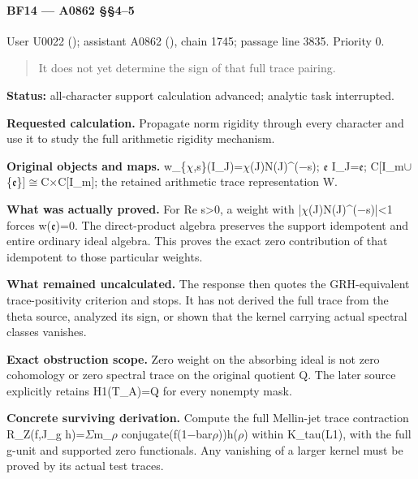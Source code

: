 \paragraph{BF14 --- A0862 §§4--5}\label{bf14-a0862-45}

User U0022 (\protect{});
assistant A0862 (\protect{}),
chain 1745; passage line 3835. Priority 0.

\begin{quote}
It does not yet determine the sign of that full trace pairing.
\end{quote}

\textbf{Status:} all-character support calculation advanced; analytic
task interrupted.

\textbf{Requested calculation.} Propagate norm rigidity through every
character and use it to study the full arithmetic rigidity mechanism.

\textbf{Original objects and maps.}
w\_\{\allowbreak{}\ensuremath{χ}\allowbreak{},s\}(I\_J)=\allowbreak{}\ensuremath{χ}\allowbreak{}(J)N(J)\textasciicircum{}(\allowbreak{}\ensuremath{−}\allowbreak{}s);
\allowbreak{}\ensuremath{𝔢}\allowbreak{}
I\_J=\allowbreak{}\ensuremath{𝔢}\allowbreak{};
C[I\_m\allowbreak{}\ensuremath{∪}\allowbreak{}\{\allowbreak{}\ensuremath{𝔢}\allowbreak{}\}]\allowbreak{}\ensuremath{≅}\allowbreak{}C\allowbreak{}\ensuremath{×}\allowbreak{}C[I\_m];
the retained arithmetic trace representation W.

\textbf{What was actually proved.} For Re s\textgreater0, a weight with
|\allowbreak{}\ensuremath{χ}\allowbreak{}(J)N(J)\textasciicircum{}(\allowbreak{}\ensuremath{−}\allowbreak{}s)|<1
forces w(\allowbreak{}\ensuremath{𝔢}\allowbreak{})=0. The direct-product
algebra preserves the support idempotent and entire ordinary ideal
algebra. This proves the exact zero contribution of that idempotent to
those particular weights.

\textbf{What remained uncalculated.} The response then quotes the
GRH-equivalent trace-positivity criterion and stops. It has not derived
the full trace from the theta source, analyzed its sign, or shown that
the kernel carrying actual spectral classes vanishes.

\textbf{Exact obstruction scope.} Zero weight on the absorbing ideal is
not zero cohomology or zero spectral trace on the original quotient Q.
The later source explicitly retains H1(T\_A)=Q for every nonempty mask.

\textbf{Concrete surviving derivation.} Compute the full Mellin-jet
trace contraction R\_Z(f,J\_g
h)=\allowbreak{}\ensuremath{Σ}\allowbreak{}m\_\allowbreak{}\ensuremath{ρ}\allowbreak{}
conjugate(f(1\allowbreak{}\ensuremath{−}\allowbreak{}bar\allowbreak{}\ensuremath{ρ}\allowbreak{}))h(\allowbreak{}\ensuremath{ρ}\allowbreak{})
within K\_tau(L1), with the full g-unit and supported zero functionals.
Any vanishing of a larger kernel must be proved by its actual test
traces.


